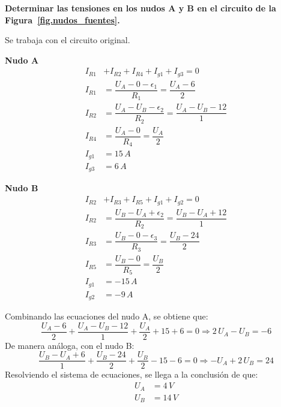 	\begin{example}\label{ex.nudos_modificados}
          \textbf{Determinar las tensiones en los nudos A y B en el
            circuito de la Figura~\ref{fig.nudos_fuentes}.}
	    
          Se trabaja con el circuito original.
	    
          \textbf{Nudo A}
          \begin{align*}
            I_{R1}& + I_{R2} + I_{R4} + I_{g1} + I_{g3} = 0\\
            I_{R1}&=\dfrac{U_A-0-\epsilon_1}{R_1}=\dfrac{U_A-6}{2}\\
            I_{R2}&=\dfrac{U_A-U_B-\epsilon_2}{R_2}=\dfrac{U_A-U_B-12}{1}\\
            I_{R4}&=\dfrac{U_A-0}{R_4}=\dfrac{U_A}{2}\\
            I_{g1}&=15\,A\\
            I_{g3}&=6\,A
          \end{align*}
	    
          \textbf{Nudo B}
          \begin{align*}
            I_{R2}& + I_{R3} + I_{R5} + I_{g1} + I_{g2} = 0\\
            I_{R2}&=\dfrac{U_B-U_A+\epsilon_2}{R_2}=\dfrac{U_B-U_A+12}{1}\\
            I_{R3}&=\dfrac{U_B-0-\epsilon_3}{R_3}=\dfrac{U_B-24}{2}\\
            I_{R5}&=\dfrac{U_B-0}{R_5}=\dfrac{U_B}{2}\\
            I_{g1}&=-15\,A\\
            I_{g2}&=-9\,A
          \end{align*}
	    
          Combinando las ecuaciones del nudo A, se obtiene que:
          \begin{equation*}
            \dfrac{U_A-6}{2}+\dfrac{U_A-U_B-12}{1}+\dfrac{U_A}{2}+15+6=0\Rightarrow 2\,U_A-U_B=-6
          \end{equation*}
          De manera análoga, con el nudo B:
          \begin{equation*}
            \dfrac{U_B-U_A+6}{1}+\dfrac{U_B-24}{2}+\dfrac{U_B}{2}-15-6=0\Rightarrow -U_A+2\,U_B=24
          \end{equation*}
          Resolviendo el sistema de ecuaciones, se llega a la
          conclusión de que:
          \begin{align*}
            U_A&=4\,V\\
            U_B&=14\,V
          \end{align*}

	\end{example}
	
